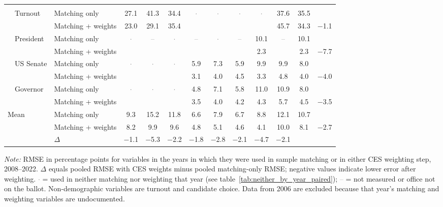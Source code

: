 \begin{table}[!htbp]
{\begin{threeparttable}
\begin{tabular}{llcccccccccc}
\addlinespace[0.3em]
\multicolumn{12}{l}{Non-demographic} \\
\addlinespace[0.1em]
~~Turnout & Matching only & 27.1 & 41.3 & 34.4 & \textcolor{gray}{$\cdot$} & \textcolor{gray}{$\cdot$} & \textcolor{gray}{$\cdot$} & \textcolor{gray}{$\cdot$} & 37.6 & 35.5 & \\
 & Matching + weights & 23.0 & 29.1 & 35.4 &  &  &  &  & 45.7 & 34.3 & $-$1.1 \\
\addlinespace[0.1em]
~~President & Matching only & \textcolor{gray}{$\cdot$} & \textcolor{gray}{--} & \textcolor{gray}{$\cdot$} & \textcolor{gray}{--} & \textcolor{gray}{$\cdot$} & \textcolor{gray}{--} & 10.1 & \textcolor{gray}{--} & 10.1 & \\
 & Matching + weights &  &  &  &  &  &  & 2.3 &  & 2.3 & $-$7.7 \\
\addlinespace[0.1em]
~~US Senate & Matching only & \textcolor{gray}{$\cdot$} & \textcolor{gray}{$\cdot$} & \textcolor{gray}{$\cdot$} & 5.9 & 7.3 & 5.9 & 9.9 & 9.9 & 8.0 & \\
 & Matching + weights &  &  &  & 3.1 & 4.0 & 4.5 & 3.3 & 4.8 & 4.0 & $-$4.0 \\
\addlinespace[0.1em]
~~Governor & Matching only & \textcolor{gray}{$\cdot$} & \textcolor{gray}{$\cdot$} & \textcolor{gray}{$\cdot$} & 4.8 & 7.1 & 5.8 & 11.0 & 10.9 & 8.0 & \\
 & Matching + weights &  &  &  & 3.5 & 4.0 & 4.2 & 4.3 & 5.7 & 4.5 & $-$3.5 \\
\midrule
Mean\tnote{b} & Matching only & 9.3 & 15.2 & 11.8 & 6.6 & 7.9 & 6.7 & 8.8 & 12.1 & 10.7 & \\
 & Matching + weights & 8.2 & 9.9 & 9.6 & 4.8 & 5.1 & 4.6 & 4.1 & 10.0 & 8.1 & $-$2.7 \\
 & $\Delta$ & $-$1.1 & $-$5.3 & $-$2.2 & $-$1.8 & $-$2.8 & $-$2.1 & $-$4.7 & $-$2.1 & & \\
\bottomrule
\end{tabular}
\begin{tablenotes}
\footnotesize
\item \textit{Note:} RMSE in percentage points for variables in the years in which they were used in sample matching or in either CES weighting step, 2008--2022. $\Delta$ equals pooled RMSE with CES weights minus pooled matching-only RMSE; negative values indicate lower error after weighting. \textcolor{gray}{$\cdot$} = used in neither matching nor weighting that year (see table~\ref{tab:neither_by_year_paired}); \textcolor{gray}{--} = not measured or office not on the ballot. Non-demographic variables are turnout and candidate choice. Data from 2006 are excluded because that year's matching and weighting variables are undocumented.

\end{tablenotes}
\end{threeparttable}}
\end{table}
